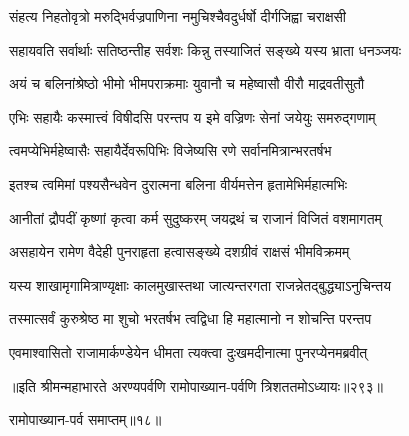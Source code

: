 \twolineshloka
{संहत्य निहतोवृत्रो मरुद्भिर्वज्रपाणिना}
{नमुचिश्चैवदुर्धर्षो दीर्गजिह्वा चराक्षसी}


\twolineshloka
{सहायवति सर्वार्थाः सतिष्ठन्तीह सर्वशः}
{किन्नु तस्याजितं सङ्ख्ये यस्य भ्राता धनञ्जयः}


\twolineshloka
{अयं च बलिनांश्रेष्ठो भीमो भीमपराक्रमाः}
{युवानौ च महेष्वासौ वीरौ माद्रवतीसुतौ}


\twolineshloka
{एभिः सहायैः कस्मात्त्वं विषीदसि परन्तप}
{य इमे वज्रिणः सेनां जयेयुः समरुद्गणाम्}


\twolineshloka
{त्वमप्येभिर्महेष्वासैः सहायैर्देवरूपिभिः}
{विजेष्यसि रणे सर्वानमित्रान्भरतर्षभ}


\twolineshloka
{इतश्च त्वमिमां पश्यसैन्धवेन दुरात्मना}
{बलिना वीर्यमत्तेन हृतामेभिर्महात्मभिः}


\twolineshloka
{आनीतां द्रौपदीं कृष्णां कृत्वा कर्म सुदुष्करम्}
{जयद्रथं च राजानं विजितं वशमागतम्}


\twolineshloka
{असहायेन रामेण वैदेही पुनराहृता}
{हत्वासङ्ख्ये दशग्रीवं राक्षसं भीमविक्रमम्}


\twolineshloka
{यस्य शाखामृगामित्राण्यृक्षाः कालमुखास्तथा}
{जात्यन्तरगता राजन्नेतद्बुद्ध्याऽनुचिन्तय}


\twolineshloka
{तस्मात्सर्वं कुरुश्रेष्ठ मा शुचो भरतर्षभ}
{त्वद्विधा हि महात्मानो न शोचन्ति परन्तप}



\twolineshloka
{एवमाश्वासितो राजामार्कण्डेयेन धीमता}
{त्यक्त्वा दुःखमदीनात्मा पुनरप्येनमब्रवीत्}


॥इति श्रीमन्महाभारते अरण्यपर्वणि रामोपाख्यान-पर्वणि त्रिशततमोऽध्यायः॥२९३॥

रामोपाख्यान-पर्व समाप्तम्॥१८॥ 

\closesection